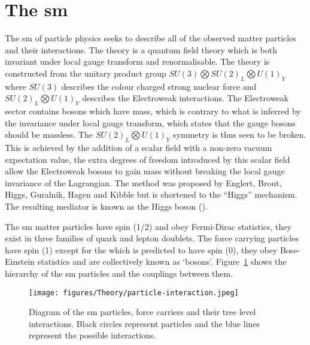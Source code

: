 \section{The \ac{sm}} %
\label{sec:the_standard_model_sm_}

The \ac{sm} of particle physics 
\cite{Glashow1961579,PhysRevLett.19.1264,tHooft1972189,} seeks to describe all 
of the observed matter particles and their interactions. The theory is a 
quantum field theory which is both invariant under local gauge transform and 
renormalisable. The theory is constructed from the unitary product group
$SU(3)\bigotimes SU(2)_{L} \bigotimes U(1)_{Y}$ where $SU(3)$ describes the
colour charged strong nuclear force and $SU(2)_{L} \bigotimes U(1)_{Y}$
describes the Electroweak interactions. The Electroweak sector contains 
bosons which have mass, which is contrary to what is inferred by the
invariance under local gauge transform, which states that the gauge bosons 
should be massless. The $SU(2)_{L} \bigotimes U(1)_{Y}$ symmetry is thus seen 
to be broken. This is achieved by the addition of a scalar field with a 
non-zero vacuum expectation value, the extra degrees of freedom introduced by 
this scalar field allow the Electroweak bosons to gain mass without breaking 
the local gauge invariance of the Lagrangian. The method was proposed by 
Englert, Brout, Higgs, Guralnik, Hagen and Kibble 
\cite{tHooft1972189,PhysRevLett.13.321,Higgs1964132,PhysRevLett.13.508,PhysRevLett.13.585,PhysRev.145.1156,PhysRev.155.1554} but 
is shortened to the ``Higgs'' mechanism. The resulting mediator is known as
the Higgs boson (\PHiggs).

The \ac{sm} matter particles have spin (1/2) and obey Fermi-Dirac statistics,
they exist in three families of quark and lepton doublets. The force carrying
particles have spin (1) except for the \PHiggs which is predicted to have spin
(0), they obey Bose-Einstein statistics and are collectively known as `bosons'.
Figure~\ref{fig:figures_Theory_particle-interaction} shows the hierarchy of the
\ac{sm} particles and the couplings between them.

\begin{figure}[htbp]
  \centering
    \texttt{[image: figures/Theory/particle-interaction.jpeg]}
  \caption{Diagram of the \ac{sm} particles, force carriers and their tree 
  level interactions. Black circles represent particles and the blue lines 
  represent the possible interactions.\cite{wikiParticleInteractions}}
  \label{fig:figures_Theory_particle-interaction}
\end{figure}

